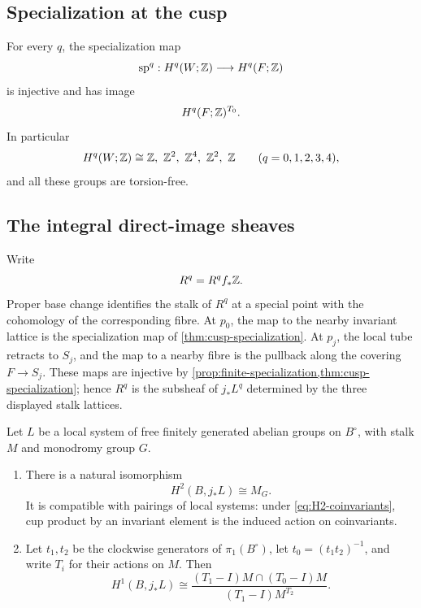 \subsection{Specialization at the cusp}
\begin{theorem}\label{thm:cusp-specialization}
For every $q$, the specialization map
\[
 \operatorname{sp}^q:H^q(W;\mathbb Z)\longrightarrow H^q(F;\mathbb Z)
\]
is injective and has image
\[
 H^q(F;\mathbb Z)^{T_0}.
\]
In particular
\[
 H^q(W;\mathbb Z)\cong
 \mathbb Z,\ \mathbb Z^2,\ \mathbb Z^4,\ \mathbb Z^2,\ \mathbb Z
 \qquad(q=0,1,2,3,4),
\]
and all these groups are torsion-free.
\end{theorem}

\subsection{The integral direct-image sheaves}
Write
\[
 R^q=R^qf_*\mathbb Z.
\]
Proper base change identifies the stalk of $R^q$ at a special point with
the cohomology of the corresponding fibre.  At $p_0$, the map to the
nearby invariant lattice is the specialization map of
\cref{thm:cusp-specialization}.  At $p_j$, the local tube retracts to
$S_j$, and the map to a nearby fibre is the pullback along the covering
$F\to S_j$.  These maps are injective by
\cref{prop:finite-specialization,thm:cusp-specialization}; hence $R^q$ is
the subsheaf of $j_*L^q$ determined by the three displayed stalk lattices.

\begin{lemma}
\label{lem:local-system-cohomology}
Let $L$ be a local system of free finitely generated abelian groups on
$B^\circ$, with stalk $M$ and monodromy group $G$.
\begin{enumerate}[label=\textup{(\roman*)}]
\item There is a natural isomorphism
\begin{equation}\label{eq:H2-coinvariants}
 H^2(B,j_*L)\cong M_G.
\end{equation}
It is compatible with pairings of local systems: under
\eqref{eq:H2-coinvariants}, cup product by an invariant element is the
induced action on coinvariants.
\item Let $t_1,t_2$ be the clockwise generators of
$\pi_1(B^\circ)$, let $t_0=(t_1t_2)^{-1}$, and write $T_i$ for their
actions on $M$.  Then
\begin{equation}\label{eq:parabolic-cohomology}
 H^1(B,j_*L)
 \cong
 \frac{(T_1-I)M\cap(T_0-I)M}{(T_1-I)M^{T_2}}.
\end{equation}
\end{enumerate}
\end{lemma}

